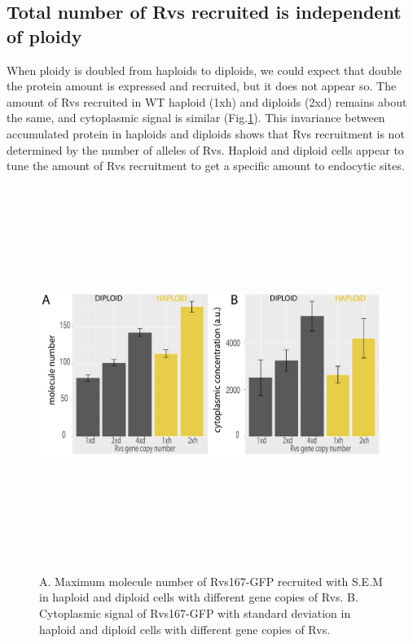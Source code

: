 \subsection{Total number of Rvs recruited is independent of ploidy}
When ploidy is doubled from haploids to diploids, we could expect that double the protein amount is expressed and recruited, but it does not appear so. The amount of Rvs recruited in WT haploid (1xh) and diploids (2xd) remains about the same, and cytoplasmic signal is similar (Fig.\ref{disc_conc}). This invariance between accumulated protein in haploids and diploids shows that Rvs recruitment is not determined by the number of alleles of Rvs. Haploid and diploid cells appear to tune the amount of Rvs recruitment to get a specific amount to endocytic sites.

	\begin{figure}[H]
	\centering
\includegraphics[width=12.5cm,height=12.5cm,keepaspectratio]{figures/discussion/number_comp}
	\caption[Recruitment of Rvs]
	{A. Maximum molecule number of Rvs167-GFP recruited with S.E.M in haploid and diploid cells with different gene copies of Rvs. 
	B. Cytoplasmic signal of Rvs167-GFP with standard deviation in haploid and diploid cells with different gene copies of Rvs. 
\label{disc_conc}}
	\end{figure}


